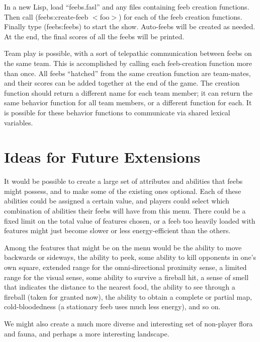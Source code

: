 \documentclass[12pt]{article}
\begin{document}
In a new Lisp, load ``feebs.fasl'' and any files containing feeb creation
functions.  Then call (feebs:create-feeb $<$foo$>$) for each of the feeb
creation functions.  Finally type (feebs:feebs) to start the show.
Auto-feebs will be created as needed.  At the end, the final scores of
all the feebs will be printed.

Team play is possible, with a sort of telepathic communication between
feebs on the same team.  This is accomplished by calling each
feeb-creation function more than once.  All feebs ``hatched'' from the
same creation function are team-mates, and their scores can be added
together at the end of the game.  The creation function should return a
different name for each team member; it can return the same behavior
function for all team members, or a different function for each.  It is
possible for these behavior functions to communicate via shared lexical
variables.

\section{Ideas for Future Extensions}

It would be possible to create a large set of attributes and abilities
that feebs might possess, and to make some of the existing ones
optional.  Each of these abilities could be assigned a certain value,
and players could select which combination of abilities their feebs will
have from this menu.  There could be a fixed limit on the total value of
features chosen, or a feeb too heavily loaded with features might just
become slower or less energy-efficient than the others.

Among the features that might be on the menu would be the ability to
move backwards or sideways, the ability to peek, some ability to kill
opponents in one's own square, extended range for the omni-directional
proximity sense, a limited range for the visual sense, some ability to
survive a fireball hit, a sense of smell that indicates the distance to
the nearest food, the ability to see through a fireball (taken for
granted now), the ability to obtain a complete or partial map,
cold-bloodedness (a stationary feeb uses much less energy), and so on.

We might also create a much more diverse and interesting set of
non-player flora and fauna, and perhaps a more interesting landscape.
\end{document}
